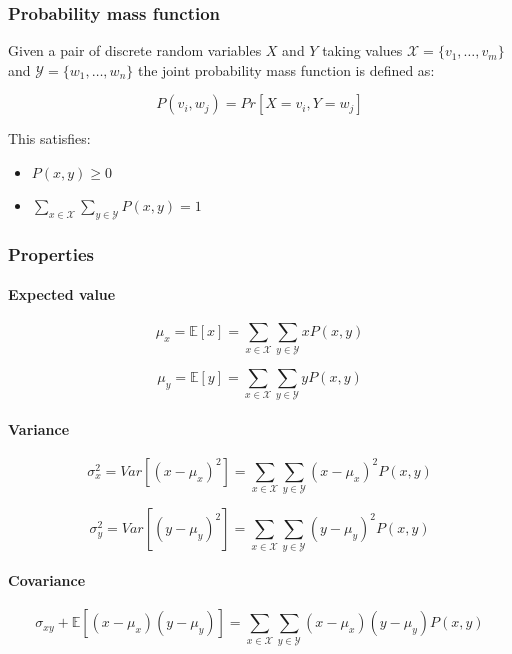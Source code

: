 		\subsubsection{Probability mass function}
		Given a pair of discrete random variables $X$ and $Y$ taking values $\mathcal{X} = \{v_1,\dots, v_m\}$ and $\mathcal{Y} = \{w_1, \dots, w_n\}$ the joint probability mass function is defined as:

		$$P(v_i, w_j) = Pr[X = v_i, Y = w_j]$$

		This satisfies:

		\begin{multicols}{2}
			\begin{itemize}
				\item $P(x,y) \ge 0$
				\item $\sum\limits_{x\in\mathcal{X}}\sum\limits_{y\in\mathcal{Y}}P(x,y) = 1$
			\end{itemize}
		\end{multicols}

		\subsubsection{Properties}

			\paragraph{Expected value}

			$$\mu_x = \mathbb{E}[x] = \sum\limits_{x\in\mathcal{X}}\sum\limits_{y\in\mathcal{Y}}xP(x,y)$$

			$$\mu_y = \mathbb{E}[y] = \sum\limits_{x\in\mathcal{X}}\sum\limits_{y\in\mathcal{Y}}yP(x,y)$$

			\paragraph{Variance}

			$$\sigma_x^2 = Var[(x-\mu_x)^2] = \sum\limits_{x\in\mathcal{X}}\sum\limits_{y\in\mathcal{Y}}(x-\mu_x)^2P(x,y)$$

			$$\sigma_y^2 = Var[(y-\mu_y)^2] = \sum\limits_{x\in\mathcal{X}}\sum\limits_{y\in\mathcal{Y}}(y-\mu_y)^2P(x,y)$$

			\paragraph{Covariance}

			$$\sigma_{xy} + \mathbb{E}[(x-\mu_x)(y-\mu_y)] = \sum\limits_{x\in\mathcal{X}}\sum\limits_{y\in\mathcal{Y}}(x-\mu_x)(y-\mu_y)P(x,y)$$

